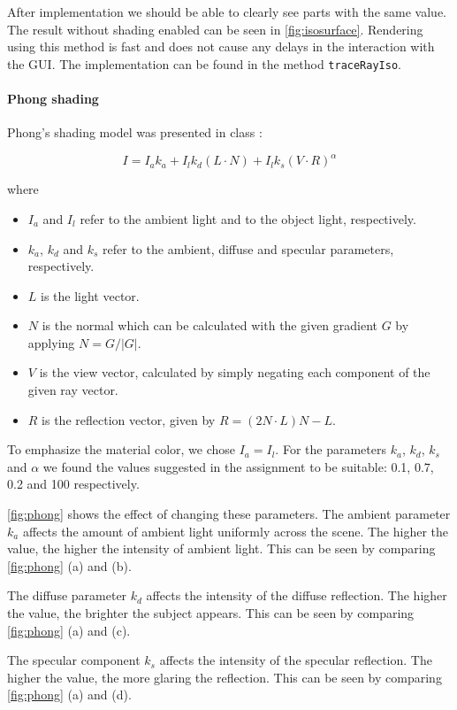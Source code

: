 \documentclass[a4paper]{article}
\begin{document}
After implementation we should be able to clearly see parts with the same value. The result without shading enabled can be seen in \autoref{fig:isosurface}. Rendering using this method is fast and does not cause any delays in the interaction with the GUI. The implementation can be found in the method {\tt traceRayIso}.

\paragraph{Phong shading}

Phong's shading model was presented in class \citep{2imv20_2}:

$$ I = I_a k_a + I_lk_d(L \cdot N)+I_l k_s (V \cdot R)^\alpha$$

\noindent where

\begin{itemize}
  \item $I_a$ and $I_l$ refer to the ambient light and to the object light, respectively.
  \item $k_a$, $k_d$ and $k_s$ refer to the ambient, diffuse and specular parameters, respectively.
  \item $L$ is the light vector.
  \item $N$ is the normal which can be calculated with the given gradient $G$ by applying $N = {G}/{|G|}$.
  \item $V$ is the view vector, calculated by simply negating each component of the given ray vector.
  \item $R$ is the reflection vector, given by $R = (2N \cdot L)N-L$.
\end{itemize}

\noindent To emphasize the material color, we chose $I_a = I_l$. For the parameters $k_a$, $k_d$, $k_s$ and $\alpha$ we found the values suggested in the assignment to be suitable: 0.1, 0.7, 0.2 and 100 respectively.

\autoref{fig:phong} shows the effect of changing these parameters. The ambient parameter $k_a$ affects the amount of ambient light uniformly across the scene. The higher the value, the higher the intensity of ambient light. This can be seen by comparing \autoref{fig:phong} (a) and (b).

The diffuse parameter $k_d$ affects the intensity of the diffuse reflection. The higher the value, the brighter the subject appears. This can be seen by comparing \autoref{fig:phong} (a) and (c).

The specular component $k_s$ affects the intensity of the specular reflection. The higher the value, the more glaring the reflection. This can be seen by comparing \autoref{fig:phong} (a) and (d).
\end{document}

